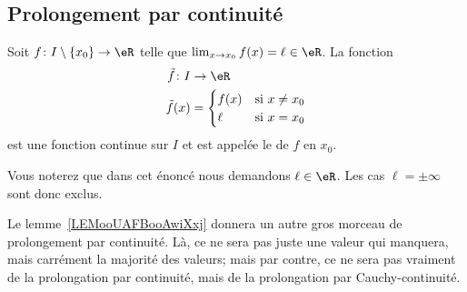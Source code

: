 \subsection{Prolongement par continuité}

\begin{propositionDef}
	Soit \( f\colon I\setminus\{ x_0 \}\to \eR\) telle que \( \lim_{x\to x_{0}} f(x)=\ell\in \eR\). La fonction
	\begin{equation}
		\begin{aligned}
			\tilde f\colon I & \to \eR                      \\
			\tilde f(x)      & =\begin{cases}
				f(x) & \text{si } x\neq x_0 \\
				\ell & \text{si } x=x_0
			\end{cases}
		\end{aligned}
	\end{equation}
	est une fonction continue sur \( I\) et est appelée le  de \( f\) en \( x_0\).
\end{propositionDef}
Vous noterez que dans cet énoncé nous demandons \( \ell\in \eR\). Les cas \( \ell=\pm\infty\) sont donc exclus.

\begin{normaltext}
	Le lemme~\ref{LEMooUAFBooAwiXxj} donnera un autre gros morceau de prolongement par continuité. Là, ce ne sera pas juste une valeur qui manquera, mais carrément la majorité des valeurs; mais par contre, ce ne sera pas vraiment de la prolongation par continuité, mais de la prolongation par Cauchy-continuité.
\end{normaltext}

